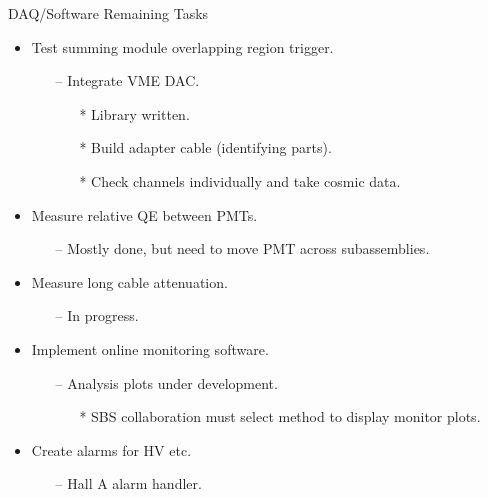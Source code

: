 \documentclass[10pt]{beamer}
\begin{document}
\begin{frame}{DAQ/Software Remaining Tasks}
    
    \begin{itemize}
    		\item Test summing module overlapping region trigger.
    			\begin{itemize}
    				\item[--] \alert{Integrate VME DAC.} 
    				\begin{itemize}
    					\item[*] Library written.
    					\item[*] Build adapter cable (identifying parts).
    					\item[*] Check channels individually and take cosmic data.
    				\end{itemize}
    			\end{itemize}
    		\item Measure relative QE between PMTs.
    			\begin{itemize}
    				\item[--] \alert{Mostly done, but need to move PMT across subassemblies.}
    			\end{itemize}
    		\item Measure long cable attenuation.
    			\begin{itemize}
    				\item[--] \alert{In progress.}
    			\end{itemize}
        \item Implement online monitoring software.
        		\begin{itemize}
        			\item[--] \alert{Analysis plots under development.} 
        				\begin{itemize}
        					\item[*] SBS collaboration must select method to display monitor plots.
					\end{itemize}        				 	
        		\end{itemize}
        \item Create alarms for HV etc.
        		\begin{itemize}
        			\item[--] \alert{Hall A alarm handler.}
        		\end{itemize}
    \end{itemize}

\end{frame}
\end{document}

